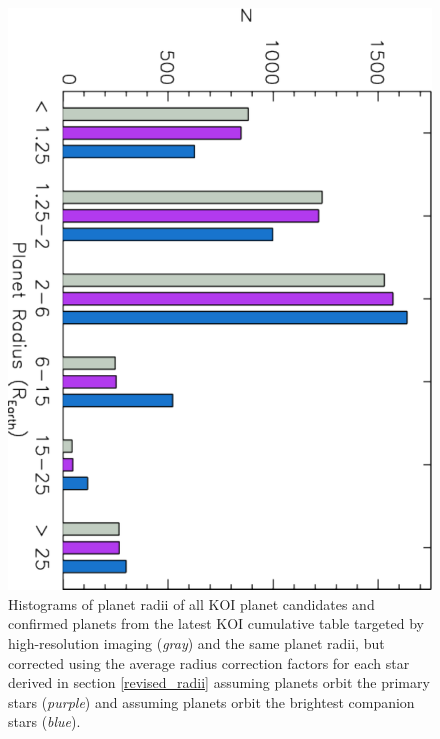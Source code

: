 \documentclass[twocolumn,appendixfloats]{aastex6}
\begin{document}
\begin{figure}[!t]
\centering
\includegraphics[angle=90, scale=0.39]{KOI_obs_planets_corr_Prad_histo.pdf}
\caption{Histograms of planet radii of all KOI planet candidates and confirmed 
planets from the latest KOI cumulative table targeted by high-resolution
imaging ({\it gray}) and the same planet radii, but corrected using the average 
radius correction factors for each star derived in section \ref{revised_radii} 
assuming planets orbit the primary stars ({\it purple}) and assuming planets 
orbit the brightest companion stars ({\it blue}).
\label{KOIs_corr_Rp_histo}}
\end{figure}
\end{document}
